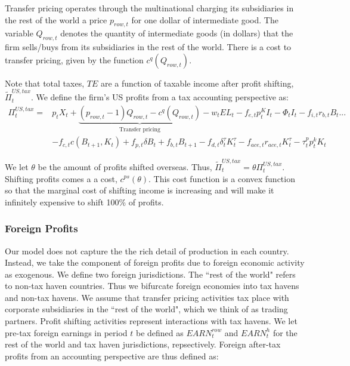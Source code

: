 Transfer pricing operates through the multinational charging its subsidiaries in the rest of the world a price $p_{row,t}$ for one dollar of intermediate good.  The variable $Q_{row,t}$ denotes the quantity of intermediate goods (in dollars) that the firm sells/buys from its subsidiaries in the rest of the world.  There is a cost to transfer pricing, given by the function $c^{q}(Q_{row,t})$.  

Note that total taxes, $TE$ are a function of taxable income after profit shifting, $\tilde{\Pi}^{US, tax}_{t}$. We define the firm's US profits from a tax accounting perspective as:
\begin{equation}
\label{eqn:profit_tax}
\begin{split}
\Pi^{US, tax}_{t}= & p_{t}X_{t}+\underbrace{(p_{row,t}-1)Q_{row,t}-c^{q}(Q_{row,t})}_{\text{Transfer pricing}}-w_{t}EL_{t}-f_{e,t}p^{K}_{t}I_{t}-\Phi_{t}I_{t}-f_{i,t}r_{b,t}B_{t}...\\
& -f_{c,t}c(B_{t+1},K_{t})+f_{p,t}\delta B_{t}+ f_{b,t}B_{t+1}-f_{d,t}\delta^{\tau}_{t}K^{\tau}_{t}-f_{ace,t}r_{ace,t}K^{\tau}_{t}-\tau^{p}_{t}p^{k}_{t}K_{t}
\end{split}
\end{equation}

We let $\theta$ be the amount of profits shifted overseas.  Thus, $\tilde{\Pi}^{US, tax}_{t}=\theta \Pi^{US, tax}_{t}$.  Shifting profits comes a a cost, $c^{ps}(\theta)$.  This cost function is a convex function so that the marginal cost of shifting income is increasing and will make it infinitely expensive to shift 100\% of profits.

\subsubsection{Foreign Profits}

Our model does not capture the the rich detail of production in each country.  Instead, we take the component of foreign profits due to foreign economic activity as exogenous.  We define two foreign jurisdictions.  The ``rest of the world" refers to non-tax haven countries.  Thus we bifurcate foreign economies into tax havens and non-tax havens.  We assume that transfer pricing activities tax place with corporate subsidiaries in the ``rest of the world", which we think of as trading partners.  Profit shifting activities represent interactions with tax havens.  We let pre-tax foreign earnings in period $t$ be defined as $EARN^{row}_{t}$ and $EARN^{h}_{t}$ for the rest of the world and tax haven jurisdictions, repsectively.  Foreign after-tax profits from an accounting perspective are thus defined as:

